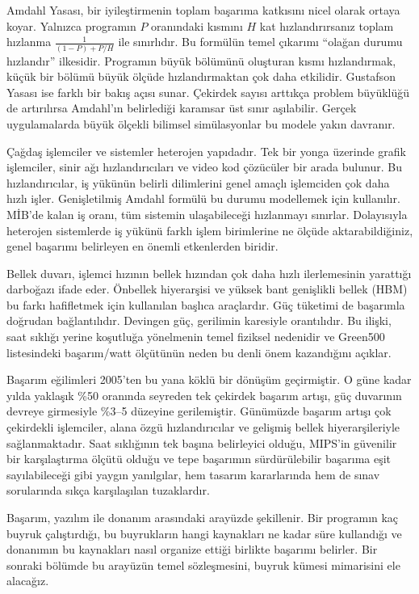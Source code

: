 Amdahl Yasası, bir iyileştirmenin toplam başarıma katkısını nicel olarak ortaya koyar. Yalnızca programın $P$ oranındaki kısmını $H$ kat hızlandırırsanız toplam hızlanma $\frac{1}{(1-P)+P/H}$ ile sınırlıdır. Bu formülün temel çıkarımı ``olağan durumu hızlandır'' ilkesidir. Programın büyük bölümünü oluşturan kısmı hızlandırmak, küçük bir bölümü büyük ölçüde hızlandırmaktan çok daha etkilidir. Gustafson Yasası ise farklı bir bakış açısı sunar. Çekirdek sayısı arttıkça problem büyüklüğü de artırılırsa Amdahl'ın belirlediği karamsar üst sınır aşılabilir. Gerçek uygulamalarda büyük ölçekli bilimsel simülasyonlar bu modele yakın davranır.

Çağdaş işlemciler ve sistemler heterojen yapıdadır. Tek bir yonga üzerinde grafik işlemciler, sinir ağı hızlandırıcıları ve video kod çözücüler bir arada bulunur. Bu hızlandırıcılar, iş yükünün belirli dilimlerini genel amaçlı işlemciden çok daha hızlı işler. Genişletilmiş Amdahl formülü bu durumu modellemek için kullanılır. MİB'de kalan iş oranı, tüm sistemin ulaşabileceği hızlanmayı sınırlar. Dolayısıyla heterojen sistemlerde iş yükünü farklı işlem birimlerine ne ölçüde aktarabildiğiniz, genel başarımı belirleyen en önemli etkenlerden biridir.

Bellek duvarı, işlemci hızının bellek hızından çok daha hızlı ilerlemesinin yarattığı darboğazı ifade eder. Önbellek hiyerarşisi ve yüksek bant genişlikli bellek (HBM) bu farkı hafifletmek için kullanılan başlıca araçlardır. Güç tüketimi de başarımla doğrudan bağlantılıdır. Devingen güç, gerilimin karesiyle orantılıdır. Bu ilişki, saat sıklığı yerine koşutluğa yönelmenin temel fiziksel nedenidir ve Green500 listesindeki başarım/watt ölçütünün neden bu denli önem kazandığını açıklar.

Başarım eğilimleri 2005'ten bu yana köklü bir dönüşüm geçirmiştir. O güne kadar yılda yaklaşık \%50 oranında seyreden tek çekirdek başarım artışı, güç duvarının devreye girmesiyle \%3--5 düzeyine gerilemiştir. Günümüzde başarım artışı çok çekirdekli işlemciler, alana özgü hızlandırıcılar ve gelişmiş bellek hiyerarşileriyle sağlanmaktadır. Saat sıklığının tek başına belirleyici olduğu, MIPS'in güvenilir bir karşılaştırma ölçütü olduğu ve tepe başarımın sürdürülebilir başarıma eşit sayılabileceği gibi yaygın yanılgılar, hem tasarım kararlarında hem de sınav sorularında sıkça karşılaşılan tuzaklardır.

Başarım, yazılım ile donanım arasındaki arayüzde şekillenir. Bir programın kaç buyruk çalıştırdığı, bu buyrukların hangi kaynakları ne kadar süre kullandığı ve donanımın bu kaynakları nasıl organize ettiği birlikte başarımı belirler. Bir sonraki bölümde bu arayüzün temel sözleşmesini, buyruk kümesi mimarisini ele alacağız.


